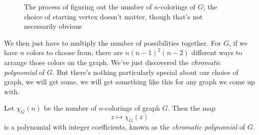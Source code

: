 \documentclass[12pt,oneside]{../../sfsuthesis}
\begin{document}
\begin{figure}[H]
\begin{subfigure}[t]{0.24\textwidth}

    \end{subfigure}
    \hfill
    \begin{subfigure}[t]{0.24\textwidth}
        \centering

    \end{subfigure}
    \caption{The process of figuring out the number of \( n \)-colorings of \( G \); the choice of starting vertex doesn't matter, though that's not necessarily obvious}
\end{figure}

We then just have to multiply the number of possibilities together.
For \( G \), if we have \( n \) colors to choose from, there are \( n {(n-1)}^2 (n - 2) \) different ways to arrange those colors on the graph.
We've just discovered the \emph{chromatic polynomial} of \( G \).
But there's nothing particularly special about our choice of graph, we will get some, we will get something like this for any graph we come up with.

\begin{proposition}\th\label{def:chromaticPoly}

    Let \( \chi_G(n) \) be the number of \( n \)-colorings of graph \( G \).
    Then the map
    \[
        z \mapsto \chi_G(z)
    \]
    is a polynomial with integer coefficients, known as the \emph{chromatic polynomial} of \( G \).

\end{proposition}
\end{document}
